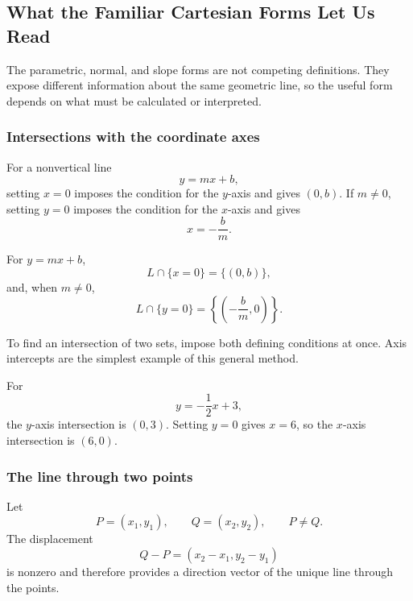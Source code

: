 \subsection{What the Familiar Cartesian Forms Let Us Read}

\begin{corebox}
The parametric, normal, and slope forms are not competing definitions. They
expose different information about the same geometric line, so the useful form
depends on what must be calculated or interpreted.
\end{corebox}

\subsubsection*{Intersections with the coordinate axes}

\begin{derivationbox}
For a nonvertical line
\[
y=mx+b,
\]
setting $x=0$ imposes the condition for the $y$-axis and gives $(0,b)$. If
$m\neq0$, setting $y=0$ imposes the condition for the $x$-axis and gives
\[
x=-\frac bm.
\]
\end{derivationbox}

\begin{theorembox}
For $y=mx+b$,
\[
\boxed{L\cap\{x=0\}=\{(0,b)\}},
\]
and, when $m\neq0$,
\[
\boxed{L\cap\{y=0\}=\left\{\left(-\frac bm,0\right)\right\}}.
\]
\end{theorembox}

\begin{interpretationbox}
To find an intersection of two sets, impose both defining conditions at once.
Axis intercepts are the simplest example of this general method.
\end{interpretationbox}

\begin{examplebox}
For
\[
y=-\frac12x+3,
\]
the $y$-axis intersection is $(0,3)$. Setting $y=0$ gives $x=6$, so the
$x$-axis intersection is $(6,0)$.
\end{examplebox}

\subsubsection*{The line through two points}

\begin{derivationbox}
Let
\[
P=(x_1,y_1),\qquad Q=(x_2,y_2),\qquad P\neq Q.
\]
The displacement
\[
Q-P=(x_2-x_1,y_2-y_1)
\]
is nonzero and therefore provides a direction vector of the unique line through
the points.
\end{derivationbox}

